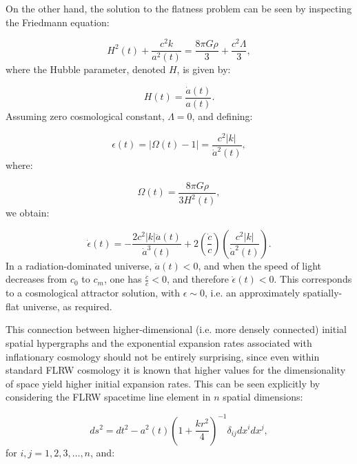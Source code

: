 \documentclass{article}
\begin{document}
On the other hand, the solution to the flatness problem can be seen by inspecting the Friedmann equation:

\begin{equation}
H^2 \left( t \right) + \frac{c^2 k}{a^2 \left( t \right)} = \frac{8 \pi G \rho}{3} + \frac{c^2 \Lambda}{3},
\end{equation}
where the Hubble parameter, denoted $H$, is given by:

\begin{equation}
H \left( t \right) = \frac{\dot{a} \left( t \right)}{a \left( t \right)}.
\end{equation}
Assuming zero cosmological constant, ${\Lambda = 0}$, and defining:

\begin{equation}
\epsilon \left( t \right) = \lvert \Omega \left( t \right) - 1 \rvert = \frac{c^2 \lvert k \rvert}{\dot{a}^2 \left( t \right)},
\end{equation}
where:

\begin{equation}
\Omega \left( t \right) = \frac{8 \pi G \rho}{3 H^2 \left( t \right)},
\end{equation}
we obtain:

\begin{equation}
\dot{\epsilon} \left( t \right) = - \frac{2 c^2 \lvert k \rvert \ddot{a} \left( t \right)}{\dot{a}^3 \left( t \right)} + 2 \left( \frac{\dot{c}}{c} \right) \left( \frac{c^2 \lvert k \rvert}{\dot{a}^2 \left( t \right)} \right).
\end{equation}
In a radiation-dominated universe, ${\ddot{a} \left( t \right) < 0}$, and when the speed of light decreases from ${c_0}$ to ${c_m}$, one has ${\frac{\dot{c}}{c} < 0}$, and therefore ${\dot{\epsilon} \left( t \right) < 0}$. This corresponds to a cosmological attractor solution, with ${\epsilon \sim 0}$, i.e. an approximately spatially-flat universe, as required.

This connection between higher-dimensional (i.e. more densely connected) initial spatial hypergraphs and the exponential expansion rates associated with inflationary cosmology should not be entirely surprising, since even within standard FLRW cosmology it is known that higher values for the dimensionality of space yield higher initial expansion rates\cite{lima}. This can be seen explicitly by considering the FLRW spacetime line element in $n$ spatial dimensions\cite{tangherlini}:

\begin{equation}
d s^2 = d t^2 - a^2 \left( t \right) \left( 1 + \frac{k r^2}{4} \right)^{-1} \delta_{i j} d x^i d x^j,
\end{equation}
for ${i, j = 1, 2, 3, \dots, n}$, and:
\end{document}
